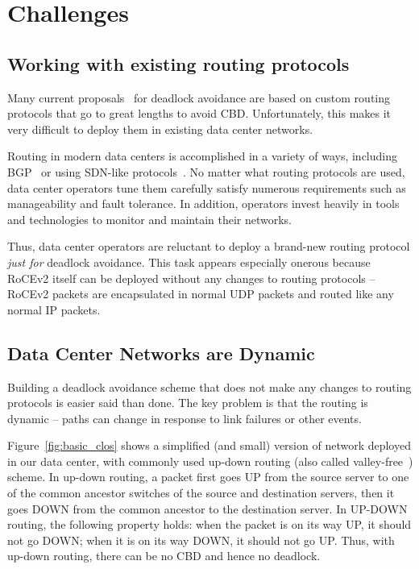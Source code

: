 \section{Challenges}
\label{sec:challenges}

\subsection{Working with existing routing protocols}
\label{sec:incremental}

Many current proposals~\cite{tcpbolt, karol2003prevention,
sancho2004,lash,wu2003fault} for deadlock avoidance are based on custom routing
protocols that go to great lengths to avoid CBD.  Unfortunately, this makes it
very difficult to deploy them in existing data center networks.

Routing in modern data centers is accomplished in a variety of ways, including
BGP~\cite{vl2, facebookrouting} or using SDN-like
protocols~\cite{singh2015jupiter}.  No matter what routing protocols are used,
data center operators tune them carefully satisfy numerous requirements such as
manageability and fault tolerance.  In addition, operators invest heavily in
tools and technologies to monitor and maintain their networks.

Thus, data center operators are reluctant to deploy a brand-new routing protocol
{\em just for} deadlock avoidance. This task appears especially onerous because
RoCEv2 itself can be deployed without any changes to routing protocols -- RoCEv2
packets are encapsulated in normal UDP packets and routed like any normal IP
packets.

\subsection{Data Center Networks are Dynamic}\label{sec:reroute}

Building a deadlock avoidance scheme that does not make any changes to routing
protocols is easier said than done. The key problem is that the routing is
dynamic -- paths can change in response to link failures or other events.

Figure~\ref{fig:basic_clos} shows a simplified (and small) version
of network deployed in our data center, with commonly used up-down routing (also
called valley-free~\cite{qiu2007toward}) scheme.  In up-down routing, a packet first
goes UP from the source server to one of the common ancestor switches of the
source and destination servers, then it goes DOWN from the common ancestor to
the destination server.  In UP-DOWN routing, the following property holds: when
the packet is on its way UP, it should not go DOWN; when it is on its way DOWN,
it should not go UP. Thus, with up-down routing, there can be no CBD and hence
no deadlock.

